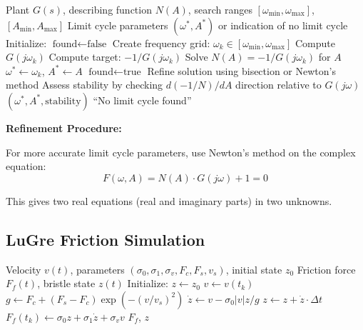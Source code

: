 \begin{algorithm}[H]
\caption{Limit Cycle Prediction via Describing Function}
\label{alg:limit_cycle}
\begin{algorithmic}[1]
\REQUIRE Plant $G(s)$, describing function $N(A)$, search ranges $[\omega_{\min}, \omega_{\max}]$, $[A_{\min}, A_{\max}]$
\ENSURE Limit cycle parameters $(\omega^*, A^*)$ or indication of no limit cycle
\STATE Initialize: $\text{found} \gets \text{false}$
\STATE Create frequency grid: $\omega_k \in [\omega_{\min}, \omega_{\max}]$
    \STATE Compute $G(j\omega_k)$
    \STATE Compute target: $-1/G(j\omega_k)$
        \STATE Solve $N(A) = -1/G(j\omega_k)$ for $A$
            \STATE $\omega^* \gets \omega_k$, $A^* \gets A$
            \STATE $\text{found} \gets \text{true}$
            \STATE Refine solution using bisection or Newton's method
        \ENDIF
    \ENDIF
\ENDFOR
{}
    \STATE Assess stability by checking $d(-1/N)/dA$ direction relative to $G(j\omega)$
    \RETURN $(\omega^*, A^*, \text{stability})$
\ELSE
    \RETURN ``No limit cycle found''
\ENDIF
\end{algorithmic}
\end{algorithm}

\textbf{Refinement Procedure:}

For more accurate limit cycle parameters, use Newton's method on the complex equation:
\begin{equation}
F(\omega, A) = N(A) \cdot G(j\omega) + 1 = 0
\end{equation}

This gives two real equations (real and imaginary parts) in two unknowns.

\subsection{LuGre Friction Simulation}

\begin{algorithm}[H]
\caption{LuGre Friction Model Integration}
\label{alg:lugre}
\begin{algorithmic}[1]
\REQUIRE Velocity $v(t)$, parameters $(\sigma_0, \sigma_1, \sigma_v, F_c, F_s, v_s)$, initial state $z_0$
\ENSURE Friction force $F_f(t)$, bristle state $z(t)$
\STATE Initialize: $z \gets z_0$
    \STATE $v \gets v(t_k)$
    \STATE $g \gets F_c + (F_s - F_c) \exp(-(v/v_s)^2)$
    \STATE $\dot{z} \gets v - \sigma_0 |v| z / g$
    \STATE $z \gets z + \dot{z} \cdot \Delta t$ 
    \STATE $F_f(t_k) \gets \sigma_0 z + \sigma_1 \dot{z} + \sigma_v v$
\ENDFOR
\RETURN $F_f$, $z$
\end{algorithmic}
\end{algorithm}

